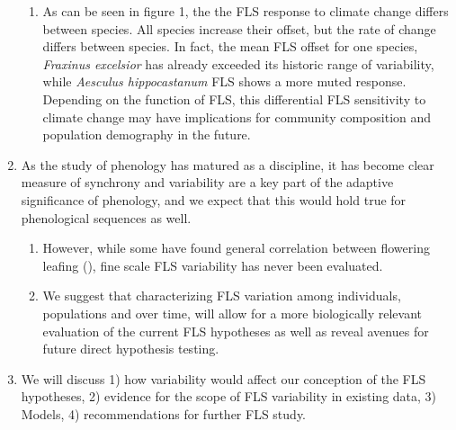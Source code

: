 \documentclass{article}
\begin{document}
\begin{enumerate}
\begin{enumerate}
     \item As can be seen in figure 1, the the FLS response to climate change differs between species. All species increase their offset, but the rate of change differs between species. In fact, the mean FLS offset for one species, \textit{Fraxinus excelsior} has already exceeded its historic range of variability, while \textit{Aesculus hippocastanum} FLS shows a more muted response. Depending on the function of FLS, this differential FLS sensitivity to climate change may have implications for community composition and population demography in the future.
    \end{enumerate}
    \item As the study of phenology has matured as a discipline, it has become clear measure of synchrony and variability are a key part of the adaptive significance of phenology, and we expect that this would hold true for phenological sequences as well.
    \begin{enumerate}
        \item However, while some have found general correlation between flowering leafing (\citep{Lechowicz}), fine scale FLS variability has never been evaluated.
        \item We suggest that characterizing FLS variation among individuals, populations and over time, will allow for a more biologically relevant evaluation of the current FLS hypotheses as well as reveal avenues for future direct hypothesis testing.
    \end{enumerate}
\item We will discuss  1) how variability would affect our conception of the FLS hypotheses, 2) evidence for the scope of FLS variability in existing data, 3) Models, 4) recommendations for further FLS study.
\end{enumerate}
\end{document}
